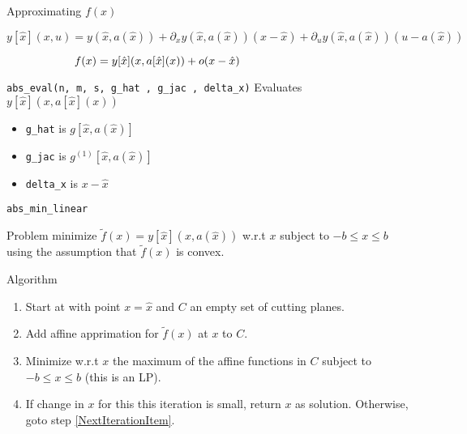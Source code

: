 \documentclass{beamer}
\begin{document}
\begin{frame}{Approximating $f(x)$}

\[
y[ \hat{x} ]( x , u )
=
y ( \hat{x}, a( \hat{x} ) )
	+ \partial_x y ( \hat{x}, a( \hat{x} ) ) ( x - \hat{x} )
	+ \partial_u y ( \hat{x}, a( \hat{x} ) ) ( u - a( \hat{x} ) )
\]
\pause


\[
f(x) = y[ \hat{x} ] ( x , a[ \hat{x} ] (x) ) + o ( x - \hat{x} )
\phantom{\rule{1.3in}{1pt}}
\]

\begin{block}{ \texttt{abs\_eval(n, m, s, g\_hat , g\_jac , delta\_x)} }
Evaluates $y[ \hat{x} ] ( x , a[ \hat{x} ] (x) )$
\end{block}
\pause

\begin{itemize}

\item
\texttt{g\_hat} is $g[ \hat{x} , a( \hat{x} ) ]$
\pause

\item
\texttt{g\_jac} is $g^{(1)} [ \hat{x} , a( \hat{x} ) ]$
\pause

\item
\texttt{delta\_x} is $x - \hat{x}$

\end{itemize}


\end{frame}

\begin{frame}{ \texttt{abs\_min\_linear} }

\begin{block}{Problem}
minimize $\tilde{f} ( x ) = y[ \hat{x} ] ( x , a( \hat{x} ) )$ w.r.t
$x$ subject to $-b \leq x \leq b$ using the assumption
that $\tilde{f} (x)$ is convex.
\end{block}
\pause


\begin{block}{Algorithm}
\begin{enumerate}

\item
Start at with point  $x = \hat{x}$ and $C$ an empty set of
cutting planes.
\pause

\item
\label{NextIterationItem}
Add affine apprimation for $\tilde{f} ( x )$ at $x$ to $C$.
\pause


\item
Minimize w.r.t $x$ the maximum of the affine functions in $C$
subject to $-b \leq x \leq b$ (this is an LP).
\pause


\item
If change in $x$ for this this iteration is small, return $x$ as solution.
Otherwise, goto step \ref{NextIterationItem}.

\end{enumerate}
\end{block}


\end{frame}
\end{document}
